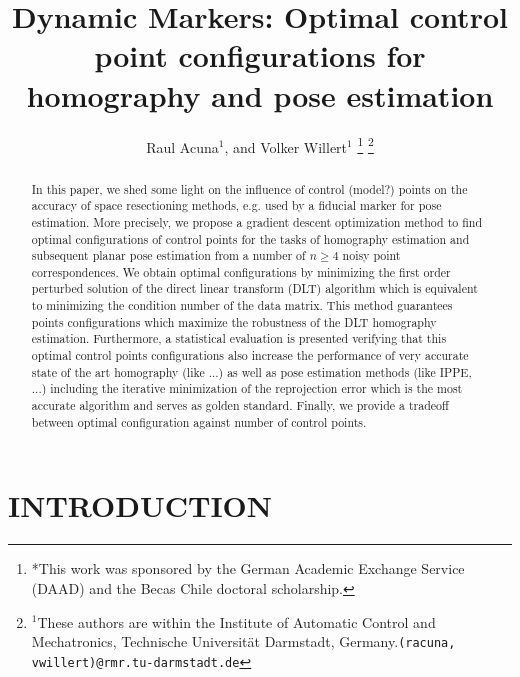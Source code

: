 \documentclass[letterpaper, 10 pt, conference]{ieeeconf}  %
\title{\LARGE \bf
Dynamic Markers: Optimal control point configurations for homography and pose estimation
}
\author{Raul Acuna$^{1}$, and Volker Willert$^{1}$%
\thanks{*This work was sponsored by the German Academic Exchange Service (DAAD) and the Becas Chile doctoral scholarship.}%
\thanks{$^{1}$These authors are within the Institute of Automatic Control and Mechatronics, Technische Universit{\"a}t Darmstadt, Germany.{\tt\small (racuna, vwillert)}{\tt\small @rmr.tu-darmstadt.de}}}
\begin{document}
\maketitle
\thispagestyle{empty}
\pagestyle{empty}
\begin{abstract}
In this paper, we shed some light on the influence of control (model?) points on the accuracy of space resectioning methods, e.g. used by a fiducial marker for pose estimation. More precisely, we propose a gradient descent optimization method to find optimal configurations of control points for the tasks of homography estimation and subsequent planar pose estimation from a number of $n \geq 4$ noisy point correspondences. We obtain optimal configurations by minimizing the first order perturbed solution of the direct linear transform (DLT) algorithm which is equivalent to minimizing the condition number of the data matrix. This method guarantees points configurations which maximize the robustness of the DLT homography estimation.
Furthermore, a statistical evaluation is presented verifying that this optimal control points configurations also increase the performance of very accurate state of the art homography (like ...) as well as pose estimation methods (like IPPE, ...) including the iterative minimization of the reprojection error which is the most accurate algorithm and serves as golden standard. Finally, we provide a tradeoff between optimal configuration against number of control points.
\end{abstract}


\section{INTRODUCTION}
\end{document}
